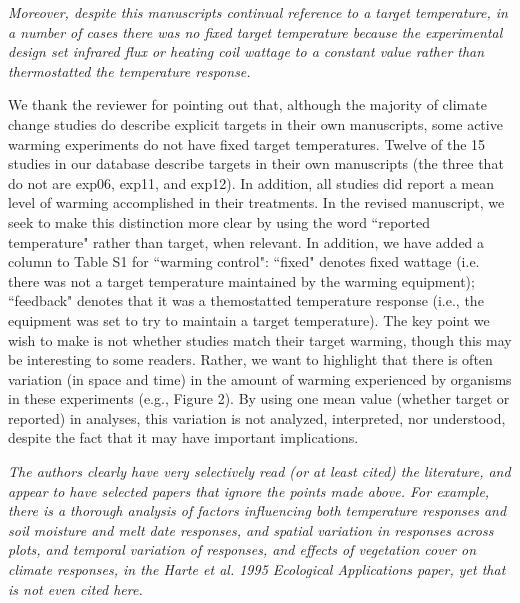 \documentclass[11pt,a4paper]{letter}
\begin{document}
\begin{letter}{}
\par \emph{Moreover, despite this manuscripts continual reference to a target temperature, in a number of cases there  was no fixed target temperature because the experimental design set infrared flux or heating coil wattage to a constant value rather than thermostatted the temperature response.}
\par We thank the reviewer for pointing out that, although the majority of climate change studies do describe explicit targets in their own manuscripts, some active warming experiments do not have fixed target temperatures. Twelve of the 15 studies in our database describe targets in their own manuscripts (the three that do not are exp06, exp11, and exp12). In addition, all studies did report a mean level of warming accomplished in their treatments. In the revised manuscript, we seek to make this distinction  more clear by  using the word ``reported temperature" rather than target, when relevant. In addition, we have added a column to Table S1 for ``warming control": ``fixed" denotes fixed wattage (i.e. there was not a target temperature maintained by the warming equipment); ``feedback" denotes that it was a themostatted temperature response (i.e., the equipment was set to try to maintain a target temperature). The key point we wish to make is not whether studies match their target warming, though this may be interesting to some readers. Rather, we want to highlight that there is often variation (in space and time) in the amount of warming experienced by organisms in these experiments (e.g., Figure 2). By using one mean value (whether target or reported) in analyses, this variation is not analyzed, interpreted, nor understood, despite the fact that it may have important implications.

\emph{The authors clearly have very selectively read (or at least cited) the literature,  and appear to have selected papers that ignore the points made above.  For example, there is a  thorough analysis of factors influencing both temperature responses and soil moisture and melt date responses, and spatial variation in responses across plots,  and temporal variation of responses, and effects of vegetation cover on climate responses, in the Harte et al. 1995 Ecological Applications paper, yet that is not even cited here.}


\end{letter}
\end{document}
